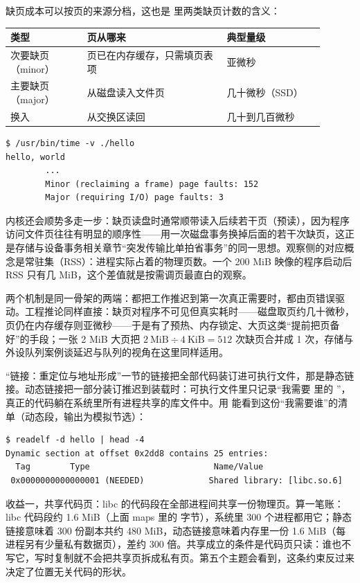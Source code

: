 缺页成本可以按页的来源分档，这也是  里两类缺页计数的含义：

\begin{longtable}{L{0.22\linewidth}L{0.40\linewidth}L{0.28\linewidth}}
\toprule
类型 & 页从哪来 & 典型量级 \\
\midrule
次要缺页（minor） & 页已在内存缓存，只需填页表项 & 亚微秒 \\\tablerowrule
主要缺页（major） & 从磁盘读入文件页 & 几十微秒（SSD） \\\tablerowrule
换入 & 从交换区读回 & 几十到几百微秒 \\
\bottomrule
\end{longtable}

\begin{lstlisting}
$ /usr/bin/time -v ./hello
hello, world
        ...
        Minor (reclaiming a frame) page faults: 152
        Major (requiring I/O) page faults: 3
\end{lstlisting}

内核还会顺势多走一步：缺页读盘时通常顺带读入后续若干页（预读），因为程序访问文件页往往有明显的顺序性——用一次磁盘事务换掉后面的若干次缺页，这正是存储与设备事务相关章节“突发传输比单拍省事务”的同一思想。观察侧的对应概念是常驻集（RSS）：进程实际占着的物理页数。一个 200 MiB 映像的程序启动后 RSS 只有几 MiB，这个差值就是按需调页最直白的观察。

两个机制是同一骨架的两端：都把工作推迟到第一次真正需要时，都由页错误驱动。工程推论同样直接：缺页对程序不可见但真实耗时——磁盘取页约几十微秒，页仍在内存缓存则亚微秒——于是有了预热、内存锁定、大页这类“提前把页备好”的手段；一张 2 MiB 大页把 $2\ \text{MiB}\div4\ \text{KiB}=512$ 次缺页合并成 1 次，存储与外设队列案例谈延迟与队列的视角在这里同样适用。

“链接：重定位与地址形成”一节的链接把全部代码装订进可执行文件，那是静态链接。动态链接把一部分装订推迟到装载时：可执行文件里只记录“我需要  里的 ”，真正的代码躺在系统里所有进程共享的库文件中。用  能看到这份“我需要谁”的清单（动态段，输出为模拟节选）：

\begin{lstlisting}
$ readelf -d hello | head -4
Dynamic section at offset 0x2dd8 contains 25 entries:
  Tag        Type                         Name/Value
 0x0000000000000001 (NEEDED)             Shared library: [libc.so.6]
\end{lstlisting}

收益一，共享代码页：libc 的代码段在全部进程间共享一份物理页。算一笔账：libc 代码段约 1.6 MiB（上面 maps 里的  字节），系统里 300 个进程都用它；静态链接意味着 300 份副本共约 480 MiB，动态链接意味着内存里一份 1.6 MiB（每进程另有少量私有数据页），差约 300 倍。共享成立的条件是代码页只读：谁也不写它，写时复制就不会把共享页拆成私有页。第五个主题会看到，这条约束反过来决定了位置无关代码的形状。

